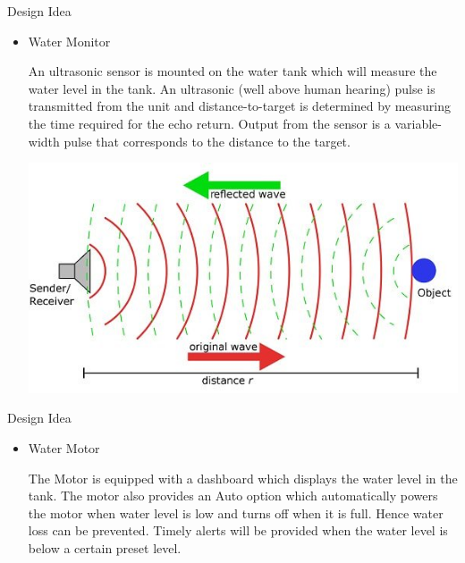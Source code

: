 \documentclass{beamer}
\begin{document}
     
     \begin{frame}{Design Idea}\pause
        \begin{itemize}
            
            \item Water Monitor \break
            \begin{flushleft}
            An ultrasonic sensor is mounted on the water tank which will measure the water level in the tank. An ultrasonic (well above human hearing) pulse is transmitted from the unit and distance-to-target is determined by measuring the time required for the echo return. Output from the sensor is a variable-width pulse that corresponds to the distance to the target.\break
            \end{flushleft}
            \centering
            \includegraphics[width=.5\textwidth,height=.3\textheight]{img/ultrasonic.jpg}
            
         \end{itemize}
    \end{frame}
    \begin{frame}{Design Idea}
        \begin{itemize}
        \begin{flushleft}
        Using a micro processor, the water level is calculated and send to the motor system electrically.\break\break
        \end{flushleft}
        
        \item Water Motor \break
        \begin{flushleft}
        The Motor is equipped with a dashboard which displays the water level in the tank. The motor also provides an Auto option which automatically powers the motor when water level is low and turns off when it is full. Hence water loss can be prevented. Timely alerts will be provided when the water level is below a certain preset level. 
        \end{flushleft}
        \end{itemize}
     \end{frame}
\end{document}
